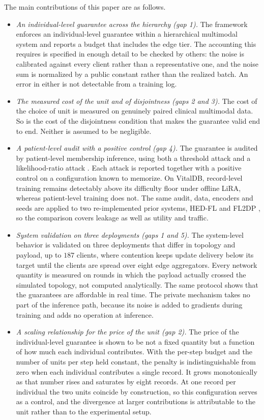 The main contributions of this paper are as follows.
\begin{itemize}
\item \emph{An individual-level guarantee across the hierarchy (gap 1).} The framework enforces an individual-level guarantee within a
hierarchical multimodal system and reports a budget that includes the edge
tier. The accounting this requires is specified in enough
detail to be checked by others: the noise is calibrated against every client
rather than a representative one, and the noise sum is normalized by a public
constant rather than the realized batch. An error in either is not detectable
from a training log.

\item \emph{The measured cost of the unit and of disjointness (gaps 2 and 3).} The cost of the choice of unit is measured on genuinely paired clinical
multimodal data. So is the cost of the disjointness condition that makes the
guarantee valid end to end. Neither is assumed to be negligible.

\item \emph{A patient-level audit with a positive control (gap 4).} The guarantee is audited by patient-level membership inference, using
both a threshold attack and a likelihood-ratio attack \cite{ref17}. Each attack
is reported together with a positive control on a configuration known to
memorize. On VitalDB, record-level training remains detectably above its
difficulty floor under offline LiRA, whereas patient-level training does not.
The same audit, data, encoders and seeds are applied to two re-implemented
prior systems, HED-FL \cite{ref3} and FL2DP \cite{ref9}, so the comparison
covers leakage as well as utility and traffic.

\item \emph{System validation on three deployments (gaps 1 and 5).} The system-level behavior is validated on three deployments that
differ in topology and payload, up to $187$ clients, where contention keeps
update delivery below its target until the clients are spread over eight edge
aggregators. Every network quantity is measured on rounds in which
the payload actually crossed the simulated topology, not computed
analytically. The same protocol shows that the guarantees are affordable in
real time. The private mechanism takes no part of the inference path, because its noise is added to gradients during training and adds
no operation at inference.

\item \emph{A scaling relationship for the price of the unit (gap 2).} The price of the individual-level guarantee is shown to be not a fixed
quantity but a function of how much each individual contributes. With the
per-step budget and the number of units per step held constant, the penalty is
indistinguishable from zero when each individual contributes a single record.
It grows monotonically as that number rises and saturates by eight records.
At one record per individual the two units coincide by construction, so this
configuration serves as a control, and the divergence at larger contributions
is attributable to the unit rather than to the experimental setup.
\end{itemize}

